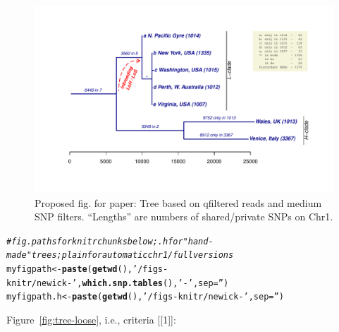 \documentclass{article}\usepackage[]{graphicx}\usepackage[]{color}
\makeatletter
\newcommand{\hlstr}[1]{\textcolor[rgb]{0.192,0.494,0.8}{#1}}%
\newcommand{\hlcom}[1]{\textcolor[rgb]{0.678,0.584,0.686}{\textit{#1}}}%
\newcommand{\hlstd}[1]{\textcolor[rgb]{0.345,0.345,0.345}{#1}}%
\newcommand{\hlkwb}[1]{\textcolor[rgb]{0.69,0.353,0.396}{#1}}%
\newcommand{\hlkwc}[1]{\textcolor[rgb]{0.333,0.667,0.333}{#1}}%
\newcommand{\hlkwd}[1]{\textcolor[rgb]{0.737,0.353,0.396}{\textbf{#1}}}%
\newenvironment{kframe}{%
 \def\at@end@of@kframe{}%
 \ifinner\ifhmode%
  \def\at@end@of@kframe{\end{minipage}}%
  \begin{minipage}{\columnwidth}%
 \fi\fi%
 \def\FrameCommand##1{\hskip\@totalleftmargin \hskip-\fboxsep
 \colorbox{shadecolor}{##1}\hskip-\fboxsep
     \hskip-\linewidth \hskip-\@totalleftmargin \hskip\columnwidth}%
 \MakeFramed {\advance\hsize-\width
   \@totalleftmargin\z@ \linewidth\hsize
   \@setminipage}}%
 {\par\unskip\endMakeFramed%
 \at@end@of@kframe}
\newenvironment{knitrout}{}{} %
\makeatother
\begin{document}
\begin{figure}
  \hspace*{-1in}%
  \includegraphics{figs-mine/paperfig-medium-tree-Chr1-qfiltered.pdf}
  \caption{Proposed fig. for paper: Tree based on qfiltered reads and medium SNP filters.  ``Lengths'' are numbers of shared/private SNPs on Chr1.}
  \label{fig:tree-paper}
\end{figure}

\begin{knitrout}\scriptsize
{}\color{fgcolor}\begin{kframe}
\begin{alltt}
\hlcom{# fig.paths for knitr chunks below;  .h for "hand-made" trees; plain for automatic chr1/full versions}
\hlstd{myfigpath}   \hlkwb{<-} \hlkwd{paste}\hlstd{(}\hlkwd{getwd}\hlstd{(),} \hlstr{'/figs-knitr/newick-'}\hlstd{,} \hlkwd{which.snp.tables}\hlstd{(),} \hlstr{'-'}\hlstd{,} \hlkwc{sep}\hlstd{=}\hlstr{''}\hlstd{)}
\hlstd{myfigpath.h} \hlkwb{<-} \hlkwd{paste}\hlstd{(}\hlkwd{getwd}\hlstd{(),} \hlstr{'/figs-knitr/newick-'}\hlstd{,} \hlkwc{sep}\hlstd{=}\hlstr{''}\hlstd{)}
\end{alltt}
\end{kframe}
\end{knitrout}

Figure~\ref{fig:tree-loose}, i.e., criteria [[1]]:
\end{document}
